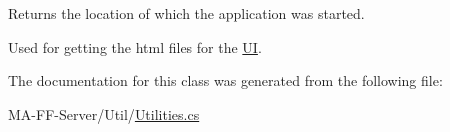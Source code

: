 Returns the location of which the application was started. 

Used for getting the html files for the \hyperlink{namespace_web_analyzer_1_1_u_i}{U\+I}.

The documentation for this class was generated from the following file\+:\begin{DoxyCompactItemize}
\item 
M\+A-\/\+F\+F-\/\+Server/\+Util/\hyperlink{_utilities_8cs}{Utilities.\+cs}\end{DoxyCompactItemize}
